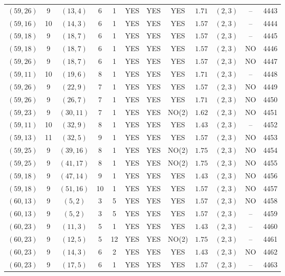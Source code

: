 \begin{longtable}{|c|c|c|c|c|c|c|c|c|c|c|c|}
$(59,26)$ & 9 & $(13,4)$ & 6 & 1 & YES & YES & YES & $1.71$ & $(2,3)$ & -- & 4443\\
$(59,16)$ & 10 & $(14,3)$ & 6 & 1 & YES & YES & YES & $1.57$ & $(2,3)$ & -- & 4444\\
$(59,18)$ & 9 & $(18,7)$ & 6 & 1 & YES & YES & YES & $1.57$ & $(2,3)$ & -- & 4445\\
$(59,18)$ & 9 & $(18,7)$ & 6 & 1 & YES & YES & YES & $1.57$ & $(2,3)$ & NO & 4446\\
$(59,26)$ & 9 & $(18,7)$ & 6 & 1 & YES & YES & YES & $1.57$ & $(2,3)$ & NO & 4447\\
$(59,11)$ & 10 & $(19,6)$ & 8 & 1 & YES & YES & YES & $1.71$ & $(2,3)$ & -- & 4448\\
$(59,26)$ & 9 & $(22,9)$ & 7 & 1 & YES & YES & YES & $1.57$ & $(2,3)$ & NO & 4449\\
$(59,26)$ & 9 & $(26,7)$ & 7 & 1 & YES & YES & YES & $1.71$ & $(2,3)$ & NO & 4450\\
$(59,23)$ & 9 & $(30,11)$ & 7 & 1 & YES & YES & NO(2) & $1.62$ & $(2,3)$ & NO & 4451\\
$(59,11)$ & 10 & $(32,9)$ & 8 & 1 & YES & YES & YES & $1.43$ & $(2,3)$ & -- & 4452\\
$(59,13)$ & 11 & $(32,5)$ & 9 & 1 & YES & YES & YES & $1.57$ & $(2,3)$ & NO & 4453\\
$(59,25)$ & 9 & $(39,16)$ & 8 & 1 & YES & YES & NO(2) & $1.75$ & $(2,3)$ & NO & 4454\\
$(59,25)$ & 9 & $(41,17)$ & 8 & 1 & YES & YES & NO(2) & $1.75$ & $(2,3)$ & NO & 4455\\
$(59,18)$ & 9 & $(47,14)$ & 9 & 1 & YES & YES & YES & $1.43$ & $(2,3)$ & NO & 4456\\
$(59,18)$ & 9 & $(51,16)$ & 10 & 1 & YES & YES & YES & $1.57$ & $(2,3)$ & NO & 4457\\
$(60,13)$ & 9 & $(5,2)$ & 3 & 5 & YES & YES & YES & $1.57$ & $(2,3)$ & NO & 4458\\
$(60,13)$ & 9 & $(5,2)$ & 3 & 5 & YES & YES & YES & $1.57$ & $(2,3)$ & -- & 4459\\
$(60,23)$ & 9 & $(11,3)$ & 5 & 1 & YES & YES & YES & $1.43$ & $(2,3)$ & -- & 4460\\
$(60,23)$ & 9 & $(12,5)$ & 5 & 12 & YES & YES & NO(2) & $1.75$ & $(2,3)$ & -- & 4461\\
$(60,23)$ & 9 & $(14,3)$ & 6 & 2 & YES & YES & YES & $1.43$ & $(2,3)$ & NO & 4462\\
$(60,23)$ & 9 & $(17,5)$ & 6 & 1 & YES & YES & YES & $1.57$ & $(2,3)$ & -- & 4463\\

\end{longtable}
